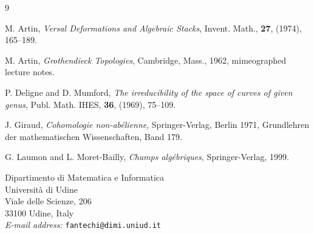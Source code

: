 \documentclass[12pt]{memoir}
\begin{document}
\begin{thebibliography}{9}

M. Artin, \emph{Versal Deformations and Algebraic Stacks}, Invent. Math., \textbf{27}, (1974), 165--189.

M. Artin, \emph{Grothendieck Topologies}, Cambridge, Mass., 1962, mimeographed lecture notes.

P. Deligne and D. Mumford, \emph{The irreducibility of the space of curves of given genus}, Publ. Math. IHES, \textbf{36}, (1969), 75--109.

J. Giraud, \emph{Cohomologie non-ab\'elienne}, Springer-Verlag, Berlin 1971, Grundlehren der mathematischen Wissenschaften, Band 179.

G. Laumon and L. Moret-Bailly, \emph{Champs alg\'ebriques}, Springer-Verlag, 1999.

\end{thebibliography}

\vspace{2em}

\noindent Dipartimento di Matematica e Informatica\\
Universit\`a di Udine\\
Viale delle Scienze, 206\\
33100 Udine, Italy\\
\emph{E-mail address:} \texttt{fantechi@dimi.uniud.it}
\end{document}
